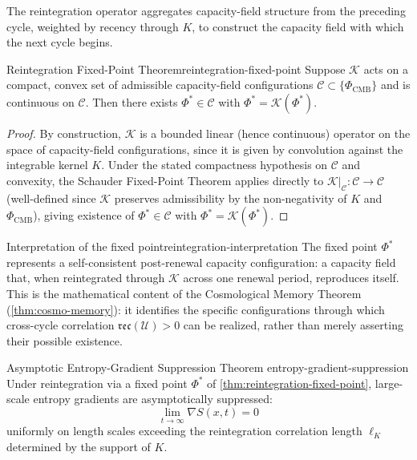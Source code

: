 \documentclass[12pt,twoside,openright]{book}
\newcommand{\reco}{\mathfrak{rec}}
\begin{document}
The reintegration operator aggregates capacity-field
structure from the preceding cycle, weighted by recency
through $K$, to construct the capacity field with which the
next cycle begins.

\begin{theorem}{Reintegration Fixed-Point Theorem}{reintegration-fixed-point}
  Suppose $\mathcal{K}$ acts on a compact, convex set of
  admissible capacity-field configurations
  $\mathcal{C} \subset \{\Phi_\mathrm{CMB}\}$ and is
  continuous on $\mathcal{C}$. Then there exists
  $\Phi^*\in\mathcal{C}$ with $\Phi^* = \mathcal{K}(\Phi^*)$.
\end{theorem}

\begin{proof}
  By construction, $\mathcal{K}$ is a bounded linear
  (hence continuous) operator on the space of capacity-field
  configurations, since it is given by convolution against
  the integrable kernel $K$. Under the stated compactness
  hypothesis on $\mathcal{C}$ and convexity, the
  Schauder Fixed-Point Theorem applies directly to
  $\mathcal{K}|_\mathcal{C} : \mathcal{C}\to\mathcal{C}$
  (well-defined since $\mathcal{K}$ preserves admissibility
  by the non-negativity of $K$ and $\Phi_\mathrm{CMB}$),
  giving existence of $\Phi^*\in\mathcal{C}$ with
  $\Phi^* = \mathcal{K}(\Phi^*)$.
\end{proof}

\begin{remark}{Interpretation of the fixed point}{reintegration-interpretation}
  The fixed point $\Phi^*$ represents a self-consistent
  post-renewal capacity configuration: a capacity field
  that, when reintegrated through $\mathcal{K}$ across one
  renewal period, reproduces itself. This is the
  mathematical content of the Cosmological Memory Theorem
  (\cref{thm:cosmo-memory}): it identifies the specific
  configurations through which cross-cycle correlation
  $\reco(\mathcal{U})>0$ can be realized, rather than merely
  asserting their possible existence.
\end{remark}

\begin{theorem}{Asymptotic Entropy-Gradient Suppression Theorem}%
  {entropy-gradient-suppression}
  Under reintegration via a fixed point $\Phi^*$ of
  \cref{thm:reintegration-fixed-point}, large-scale entropy
  gradients are asymptotically suppressed:
  \[
    \lim_{t\to\infty} \nabla S(x,t) = 0
  \]
  uniformly on length scales exceeding the reintegration
  correlation length $\ell_K$ determined by the support of
  $K$.
\end{theorem}
\end{document}

